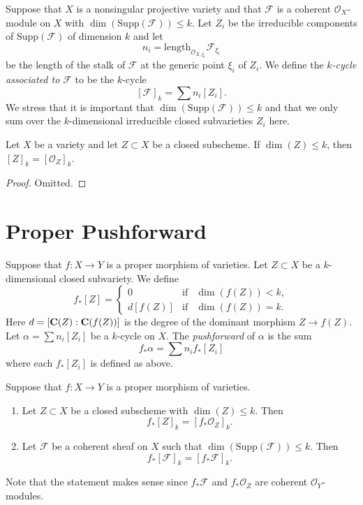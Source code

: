 \noindent
Suppose that $X$ is a 
nonsingular projective variety and that ${\mathcal F}$ is a coherent
${\mathcal O}_X$-module on $X$ with $\dim(\text{Supp}({\mathcal F})) \leq k$.
Let $Z_i$ be the irreducible components of $\text{Supp}({\mathcal F})$
of dimension $k$ and let
$$
n_i = \text{length}_{\mathcal{O}_{X, \xi_i}} \mathcal{F}_{\xi_i}
$$
be the length of the stalk
of ${\mathcal F}$ at the generic point $\xi_i$ of $Z_i$. We define the
{\it $k$-cycle associated to ${\mathcal F}$} to be the $k$-cycle
$$
[{\mathcal F}]_k = \sum n_i [Z_i].
$$
We stress that it is important that $\dim(\text{Supp}(\mathcal{F})) \leq k$
and that we only sum over the $k$-dimensional irreducible closed subvarieties
$Z_i$ here.

\begin{lemma}
\label{lemma-cycle-closed-coherent}
Let $X$ be a variety and let $Z \subset X$ be a closed subscheme.
If $\dim(Z) \leq k$, then $[Z]_k = [{\mathcal O}_Z]_k$.
\end{lemma}

\begin{proof}
Omitted.
\end{proof}

\section{Proper Pushforward}
\label{section-pushforward}

\noindent
Suppose that $f : X \to Y$ is a proper morphism of varieties.
Let $Z \subset X$ be a $k$-dimensional closed subvariety.
We define
$$
f_*[Z] =
\left\{
\begin{matrix}
0 & \text{if} & \dim(f(Z))< k, \\
d [f(Z)] & \text{if} & \dim(f(Z)) = k.
\end{matrix}
\right.
$$
Here $d=[{\bf C}(Z): {\bf C}(f(Z))]$
is the degree of the dominant morphism $Z \to f(Z)$.
Let $\alpha = \sum n_i [Z_i]$ be a $k$-cycle on $X$. The
{\it pushforward} of $\alpha$ is the sum
$$
f_* \alpha = \sum n_i f_*[Z_i]
$$
where each $f_*[Z_i]$ is defined as above.

\begin{lemma}
\label{lemma-cycle-push-sheaf}
Suppose that $f : X \to Y$ is a proper morphism of varieties.
\begin{enumerate}
\item Let $Z \subset X$ be a closed subscheme with
$\dim(Z) \leq k$. Then
$$
f_*[Z]_k = [f_*{\mathcal O}_Z]_k.
$$
\item Let $\mathcal{F}$ be a coherent sheaf on $X$ such that
$\dim(\text{Supp}(\mathcal{F})) \leq k$. Then
$$
f_*[\mathcal{F}]_k = [f_*{\mathcal F}]_k.
$$
\end{enumerate}
Note that the statement makes sense since $f_*\mathcal{F}$ and
$f_*\mathcal{O}_Z$ are coherent $\mathcal{O}_Y$-modules.
\end{lemma}

